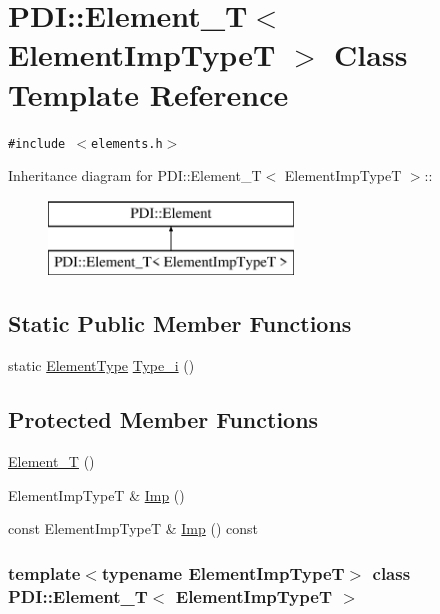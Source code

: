 \hypertarget{class_p_d_i_1_1_element___t}{
\section{PDI::Element\_\-T$<$ ElementImpTypeT $>$ Class Template Reference}
\label{class_p_d_i_1_1_element___t}
}
{\tt \#include $<$elements.h$>$}

Inheritance diagram for PDI::Element\_\-T$<$ ElementImpTypeT $>$::\begin{figure}[H]
\begin{center}
\leavevmode
\includegraphics[height=2cm]{class_p_d_i_1_1_element___t}
\end{center}
\end{figure}
\subsection*{Static Public Member Functions}
\begin{CompactItemize}
\item 
static \hyperlink{namespace_p_d_i_bbd28c6f8905ff6834d6f84ba4363e5e}{ElementType} \hyperlink{class_p_d_i_1_1_element___t_b26e3df50adb5f550ef5fe5ea90e5cdd}{Type\_\-i} ()
\end{CompactItemize}
\subsection*{Protected Member Functions}
\begin{CompactItemize}
\item 
\hyperlink{class_p_d_i_1_1_element___t_7796396b8a0e0d5574aa400fbfe59b09}{Element\_\-T} ()
\item 
ElementImpTypeT \& \hyperlink{class_p_d_i_1_1_element___t_f4ad2ab4d78c0b363b46d6175efefe83}{Imp} ()
\item 
const ElementImpTypeT \& \hyperlink{class_p_d_i_1_1_element___t_ab103fde8c88e45b9734418e6af3c9c0}{Imp} () const 
\end{CompactItemize}
\subsubsection*{template$<$typename ElementImpTypeT$>$ class PDI::Element\_\-T$<$ ElementImpTypeT $>$}



